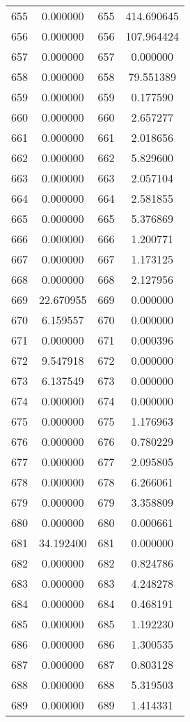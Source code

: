 \documentclass[12pt]{article}
\begin{document}
\begin{longtable}{@{}cccc@{}}
655 & 0.000000 & 655 & 414.690645 \\
656 & 0.000000 & 656 & 107.964424 \\
657 & 0.000000 & 657 & 0.000000 \\
658 & 0.000000 & 658 & 79.551389 \\
659 & 0.000000 & 659 & 0.177590 \\
660 & 0.000000 & 660 & 2.657277 \\
661 & 0.000000 & 661 & 2.018656 \\
662 & 0.000000 & 662 & 5.829600 \\
663 & 0.000000 & 663 & 2.057104 \\
664 & 0.000000 & 664 & 2.581855 \\
665 & 0.000000 & 665 & 5.376869 \\
666 & 0.000000 & 666 & 1.200771 \\
667 & 0.000000 & 667 & 1.173125 \\
668 & 0.000000 & 668 & 2.127956 \\
669 & 22.670955 & 669 & 0.000000 \\
670 & 6.159557 & 670 & 0.000000 \\
671 & 0.000000 & 671 & 0.000396 \\
672 & 9.547918 & 672 & 0.000000 \\
673 & 6.137549 & 673 & 0.000000 \\
674 & 0.000000 & 674 & 0.000000 \\
675 & 0.000000 & 675 & 1.176963 \\
676 & 0.000000 & 676 & 0.780229 \\
677 & 0.000000 & 677 & 2.095805 \\
678 & 0.000000 & 678 & 6.266061 \\
679 & 0.000000 & 679 & 3.358809 \\
680 & 0.000000 & 680 & 0.000661 \\
681 & 34.192400 & 681 & 0.000000 \\
682 & 0.000000 & 682 & 0.824786 \\
683 & 0.000000 & 683 & 4.248278 \\
684 & 0.000000 & 684 & 0.468191 \\
685 & 0.000000 & 685 & 1.192230 \\
686 & 0.000000 & 686 & 1.300535 \\
687 & 0.000000 & 687 & 0.803128 \\
688 & 0.000000 & 688 & 5.319503 \\
689 & 0.000000 & 689 & 1.414331 \\

\end{longtable}
\end{document}
